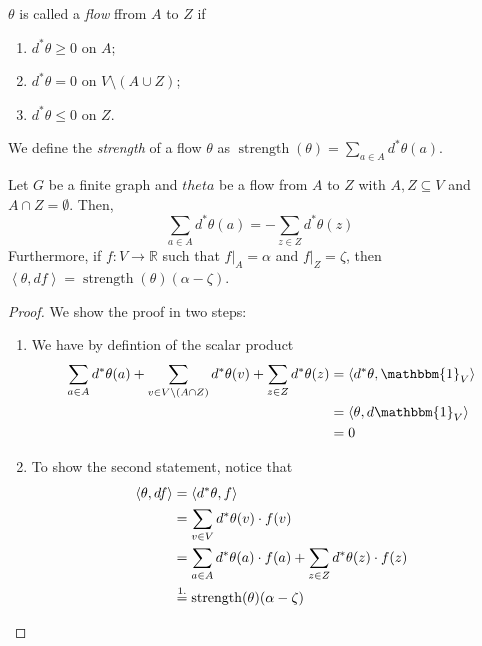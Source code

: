 \begin{defn}
   \(\theta\) is called a \emph{flow} ffrom \(A\) to \(Z\) if 
   \begin{enumerate}[1)]
     \item \(d^*\theta \geq 0\) on \(A\);
     \item \(d^*\theta =0\) on \(V \setminus (A\cup Z)\); 
     \item \(d^*\theta\leq 0\) on \(Z\).
   \end{enumerate}
   We define the \emph{strength} of a flow \(\theta\) as \( \operatorname{strength}(\theta) = \sum_{a\in A} d^*\theta(a)  \).
\end{defn}

\begin{lem}
    Let \(G\) be a finite graph and \(theta\) be a flow from \(A\) to \(Z\) with \(A,Z \subseteq  V\) and \(A \cap Z = \emptyset \). Then, 
    \[\sum_{a \in A} d^* \theta(a) = - \sum_{z\in Z} d^*\theta(z)\]
    Furthermore, if \(f:V \to \mathbb{R}\) such that \(f\vert_A = \alpha \) and \(f\vert_Z=\zeta\), then \( \left\langle \theta, df \right\rangle = \operatorname{strength}(\theta)(\alpha-\zeta)\).
\end{lem}


\begin{proof}
   We show the proof in two steps:
  \begin{enumerate}[]
    \item We have by defintion of the scalar product
      \begin{align*}
        \sum_{a\in A} d^* \theta(a) + \sum_{v\in V \setminus (A\cap Z)} d^*\theta(v) + \sum_{z\in Z} d^*\theta(z) &= \left\langle d^*\theta, \mathbbm{1}_V \right\rangle \\
                                                                                                                  &= \left\langle \theta, d \mathbbm{1}_V \right\rangle \\
                                                                                                                  &=0
      \end{align*}
    \item To show the second statement, notice that 
      \begin{align*}
        \left\langle \theta, df \right\rangle &= \left\langle d^*\theta, f \right\rangle \\
                                              &=\sum_{v\in V} d^*\theta(v)\cdot f(v) \\ 
                                              &=\sum_{a\in A} d^*\theta(a)\cdot f(a) + \sum_{z\in Z} d^*\theta(z)\cdot f(z) \\
                                              &\overset{\mathclap{1.}}{=} \operatorname{strength}(\theta)(\alpha-\zeta)
      \end{align*}
      
  \end{enumerate}
  
\end{proof}

